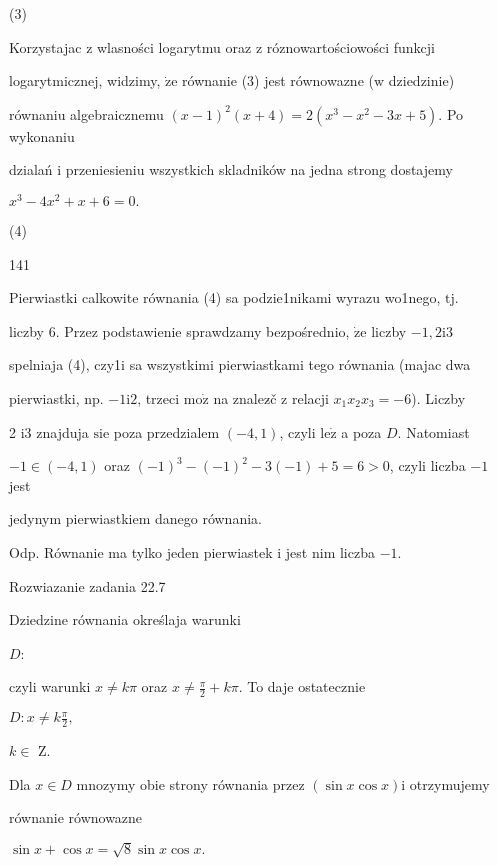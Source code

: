 \documentclass[a4paper,12pt]{article}
\begin{document}
(3)

Korzystajac $\mathrm{z}$ wlasności logarytmu oraz $\mathrm{z}$ róznowartościowości funkcji

logarytmicznej, widzimy, $\dot{\mathrm{z}}\mathrm{e}$ równanie (3) jest równowazne ($\mathrm{w}$ dziedzinie)

równaniu algebraicznemu $(x-1)^{2}(x+4)=2(x^{3}-x^{2}-3x+5)$. Po wykonaniu

dzialań $\mathrm{i}$ przeniesieniu wszystkich skladników na jedna strong dostajemy

$x^{3}-4x^{2}+x+6=0.$

(4)





141

Pierwiastki calkowite równania (4) sa podzie1nikami wyrazu wo1nego, $\mathrm{t}\mathrm{j}.$

liczby 6. Przez podstawienie sprawdzamy bezpośrednio, $\dot{\mathrm{z}}\mathrm{e}$ liczby $-1, 2\mathrm{i}3$

spelniaja (4), czy1i sa wszystkimi pierwiastkami tego równania (majac dwa

pierwiastki, np. $-1\mathrm{i}2$, trzeci $\mathrm{m}\mathrm{o}\dot{\mathrm{z}}$ na znalez$\acute{}$č $\mathrm{z}$ relacji $x_{1}x_{2}x_{3}=-6$). Liczby

2 $\mathrm{i}3$ znajduja $\mathrm{s}\mathrm{i}\mathrm{e}$ poza przedzialem $(-4,1)$, czyli $\mathrm{l}\mathrm{e}\dot{\mathrm{z}}$ a poza $D$. Natomiast

$-1\in(-4,1)$ oraz $(-1)^{3}-(-1)^{2}-3(-1)+5=6>0$, czyli liczba $-1$ jest

jedynym pierwiastkiem danego równania.

Odp. Równanie ma tylko jeden pierwiastek $\mathrm{i}$ jest nim liczba $-1.$

Rozwiazanie zadania 22.7

Dziedzine równania określaja warunki

$D$: 

czyli warunki $ x\neq k\pi$ oraz $ x\displaystyle \neq\frac{\pi}{2}+k\pi$. To daje ostatecznie

$D:x\displaystyle \neq k\frac{\pi}{2},$

$ k\in$ Z.

Dla $x\in D$ mnozymy obie strony równania przez $(\sin x\cos x)\mathrm{i}$ otrzymujemy

równanie równowazne

$\sin x+\cos x=\sqrt{8}\sin x\cos x.$
\end{document}
